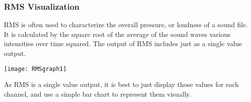 \subsubsection{RMS Visualization}
RMS is often used to characterize the overall pressure, or loudness of a sound file. It is calculated by the square root of the average of the sound wave\textquotesingle s various intensities over time squared. The output of RMS includes just as a single value output.

\begin{center}
  \texttt{[image: RMSgraph1]} \\[12pt]
\end{center}
As RMS is a single value output, it is best to just display those values for each channel, and use a simple bar chart to represent them visually.

